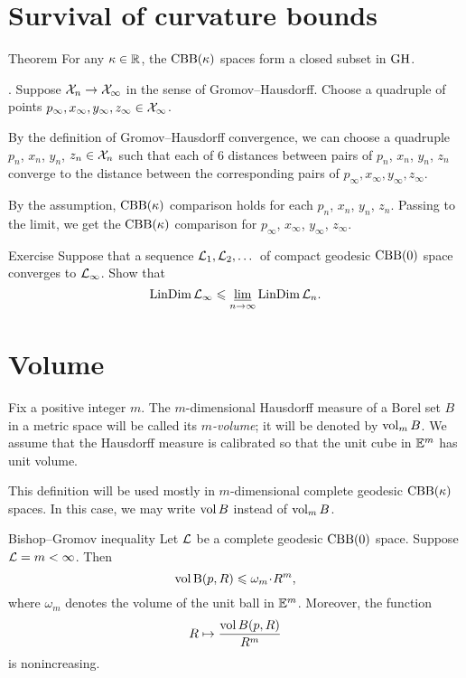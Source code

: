 \section{Survival of curvature bounds}

\begin{thm}{Theorem}\label{thm:CBB-closed}
For any $\kappa\in\mathbb{R}$, the $\mathrm{CBB}(\kappa)$ spaces form a closed subset in $\operatorname{\rm GH}\nolimits$.
\end{thm}

.
Suppose $\mathcal{X}_n\to\mathcal{X}_\infty$ in the sense of Gromov--Hausdorff.
Choose a quadruple of points $p_\infty, x_\infty,y_\infty,z_\infty\in \mathcal{X}_\infty$.

By the definition of Gromov--Hausdorff convergence, we can choose a quadruple $p_n$,  $x_n$, $y_n$, $z_n\in \mathcal{X}_n$ such that each of 6 distances between pairs of $p_n$, $x_n$, $y_n$, $z_n$ converge to the distance between the corresponding pairs of $p_\infty, x_\infty,y_\infty,z_\infty$.

By the assumption, $\mathrm{CBB}(\kappa)$ comparison holds for each $p_n$, $x_n$, $y_n$, $z_n$.
Passing to the limit, we get the $\mathrm{CBB}(\kappa)$ comparison for $p_\infty$,  $x_\infty$, $y_\infty$, $z_\infty$.
\qeds

\begin{thm}{Exercise}\label{ex:dim-lim}
Suppose that a sequence $\mathcal{L}_1,\mathcal{L}_2,\dots$ of compact geodesic $\mathrm{CBB}(0)$ space converges to $\mathcal{L}_\infty$.
Show that
\[\mathop{\rm LinDim}\nolimits \mathcal{L}_\infty\leqslant \varliminf_{n\to\infty} \mathop{\rm LinDim}\nolimits \mathcal{L}_n.\]
\end{thm}


\section{Volume}

Fix a positive integer $m$.
The $m$-dimensional Hausdorff measure of a Borel set $B$ in a metric space will be called its \emph{$m$-volume}; it will be denoted by $\operatorname{\rm vol}\nolimits_m B$.
We assume that the Hausdorff measure is calibrated so that the unit cube in $\mathbb{E}^m$ has unit volume.

This definition will be used mostly in $m$-dimensional complete geodesic $\mathrm{CBB}(\kappa)$ spaces.
In this case, we may write $\operatorname{\rm vol}\nolimits B$ instead of $\operatorname{\rm vol}\nolimits_m B$.


\begin{thm}{Bishop--Gromov inequality}\label{inq:BG}
Let $\mathcal{L}$ be a complete geodesic $\mathrm{CBB}(0)$ space.
Suppose $\mathcal{L}=m<\infty$.
Then 
\[\vol \oBall(p,R)\le \omega_m\cdot R^m,\]
where $\omega_m$ denotes the volume of the unit ball in $\mathbb{E}^m$.
Moreover, the function 
\[R\mapsto \frac{\operatorname{\rm vol}\nolimits B(p,R)}{R^m}\]
is nonincreasing.
\end{thm}

